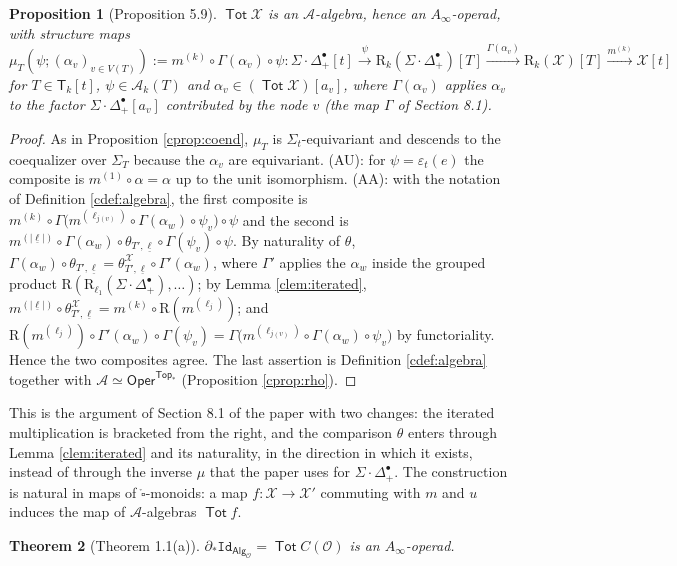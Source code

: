 \documentclass[12pt]{article}
\theoremstyle{plain}
\newtheorem{ctheorem}{Theorem}
\newtheorem{cproposition}[ctheorem]{Proposition}
\theoremstyle{definition}
\theoremstyle{remark}
\newcommand{\Cal}[1]{\mathcal{#1}}
\newcommand{\Alg}[1]{\mathsf{Alg}_{\mathcal{#1}}}
\newcommand{\Id}{\mathtt{Id}}
\newcommand{\Tot}{\operatorname{\mathsf{Tot}}}
\newcommand{\Oper}{\mathsf{Oper}}
\newcommand{\boxcirc}{\mathring{\square}}
\newcommand{\SD}{\Sigma{\cdot}\Delta^{\bullet}}
\newcommand{\Top}{\mathsf{Top}_*}
\newcommand{\Tr}{\mathsf{T}}
\newcommand{\Rr}{\mathrm{R}}
\begin{document}
\begin{cproposition}[Proposition 5.9]\label{cprop:59}
$\Tot\Cal X$ is an $\Cal A$-algebra, hence an $A_\infty$-operad, with structure maps
\[\mu_T(\psi;(\alpha_v)_{v\in V(T)}):=m^{(k)}\circ\Gamma(\alpha_v)\circ\psi\colon\SD_+[t]\xrightarrow{\ \psi\ }\Rr_k(\SD_+)[T]\xrightarrow{\Gamma(\alpha_v)}\Rr_k(\Cal X)[T]\xrightarrow{m^{(k)}}\Cal X[t]\]
for $T\in\Tr_k[t]$, $\psi\in\Cal A_k(T)$ and $\alpha_v\in(\Tot\Cal X)[a_v]$, where $\Gamma(\alpha_v)$ applies $\alpha_v$ to the factor $\SD_+[a_v]$ contributed by the node $v$ (the map $\Gamma$ of Section 8.1).
\end{cproposition}

\begin{proof}
As in Proposition \ref{cprop:coend}, $\mu_T$ is $\Sigma_t$-equivariant and descends to the coequalizer over $\Sigma_T$ because the $\alpha_v$ are equivariant. (AU): for $\psi=\varepsilon_t(e)$ the composite is $m^{(1)}\circ\alpha=\alpha$ up to the unit isomorphism. (AA): with the notation of Definition \ref{cdef:algebra}, the first composite is $m^{(k)}\circ\Gamma\big(m^{(\ell_{j(v)})}\circ\Gamma(\alpha_w)\circ\psi_v\big)\circ\psi$ and the second is $m^{(|\underline\ell|)}\circ\Gamma(\alpha_w)\circ\theta_{T',\underline\ell}\circ\Gamma(\psi_v)\circ\psi$. By naturality of $\theta$, $\Gamma(\alpha_w)\circ\theta_{T',\underline\ell}=\theta^{\Cal X}_{T',\underline\ell}\circ\Gamma'(\alpha_w)$, where $\Gamma'$ applies the $\alpha_w$ inside the grouped product $\Rr(\Rr_{\ell_1}(\SD_+),\dots)$; by Lemma \ref{clem:iterated}, $m^{(|\underline\ell|)}\circ\theta^{\Cal X}_{T',\underline\ell}=m^{(k)}\circ\Rr(m^{(\ell_j)})$; and $\Rr(m^{(\ell_j)})\circ\Gamma'(\alpha_w)\circ\Gamma(\psi_v)=\Gamma\big(m^{(\ell_{j(v)})}\circ\Gamma(\alpha_w)\circ\psi_v\big)$ by functoriality. Hence the two composites agree. The last assertion is Definition \ref{cdef:algebra} together with $\Cal A\simeq\Oper^{\Top}$ (Proposition \ref{cprop:rho}).
\end{proof}

This is the argument of Section 8.1 of the paper with two changes: the iterated multiplication is bracketed from the right, and the comparison $\theta$ enters through Lemma \ref{clem:iterated} and its naturality, in the direction in which it exists, instead of through the inverse $\mu$ that the paper uses for $\SD_+$. The construction is natural in maps of $\boxcirc$-monoids: a map $f\colon\Cal X\to\Cal X'$ commuting with $m$ and $u$ induces the map of $\Cal A$-algebras $\Tot f$.

\begin{ctheorem}[Theorem 1.1(a)]\label{cthm:1a}
$\partial_*\Id_{\Alg{O}}=\Tot C(\Cal O)$ is an $A_\infty$-operad.
\end{ctheorem}
\end{document}
